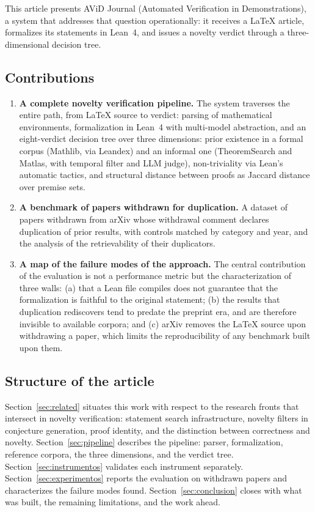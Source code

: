 \documentclass{article}
\theoremstyle{remark}
\begin{document}
This article presents AViD Journal (Automated Verification in Demonstrations), a system that addresses that question operationally: it receives a LaTeX article, formalizes its statements in Lean~4, and issues a novelty verdict through a three-dimensional decision tree.

\subsection{Contributions}

\begin{enumerate}
\item \textbf{A complete novelty verification pipeline.} The system traverses the entire path, from LaTeX source to verdict: parsing of mathematical environments, formalization in Lean~4 with multi-model abstraction, and an eight-verdict decision tree over three dimensions: prior existence in a formal corpus (Mathlib, via Leandex) and an informal one (TheoremSearch and Matlas, with temporal filter and LLM judge), non-triviality via Lean's automatic tactics, and structural distance between proofs as Jaccard distance over premise sets.

\item \textbf{A benchmark of papers withdrawn for duplication.} A dataset of papers withdrawn from arXiv whose withdrawal comment declares duplication of prior results, with controls matched by category and year, and the analysis of the retrievability of their duplicators.

\item \textbf{A map of the failure modes of the approach.} The central contribution of the evaluation is not a performance metric but the characterization of three walls: (a) that a Lean file compiles does not guarantee that the formalization is faithful to the original statement; (b) the results that duplication rediscovers tend to predate the preprint era, and are therefore invisible to available corpora; and (c) arXiv removes the LaTeX source upon withdrawing a paper, which limits the reproducibility of any benchmark built upon them.
\end{enumerate}

\subsection{Structure of the article}

Section~\ref{sec:related} situates this work with respect to the research fronts that intersect in novelty verification: statement search infrastructure, novelty filters in conjecture generation, proof identity, and the distinction between correctness and novelty. Section~\ref{sec:pipeline} describes the pipeline: parser, formalization, reference corpora, the three dimensions, and the verdict tree. Section~\ref{sec:instrumentos} validates each instrument separately. Section~\ref{sec:experimentos} reports the evaluation on withdrawn papers and characterizes the failure modes found. Section~\ref{sec:conclusion} closes with what was built, the remaining limitations, and the work ahead.
\end{document}
